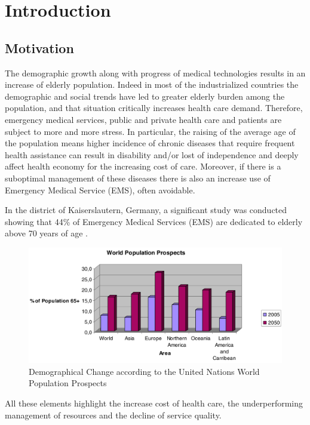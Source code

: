 \documentclass{thesisreport}
\begin{document}
 \listoftables
 
 \tableofcontents
 
 
 \chapter{Introduction}

\section{Motivation}
  The demographic growth along with progress of medical technologies results in an increase of elderly population. Indeed in most of the industrialized countries the demographic and social trends have led to greater elderly burden among the population, and that situation critically increases health care demand. Therefore, emergency medical services, public and private health care and patients are subject to more and more stress. 
  In particular, the raising of the average age of the population means higher incidence of chronic diseases that require frequent health assistance can result in disability and/or lost of independence and deeply affect health economy for the increasing cost of care. Moreover, if there is a suboptimal management of these diseases there is also an increase use of Emergency Medical Service (EMS), often avoidable.
 
 In the district of Kaiserslautern, Germany, a significant study was conducted showing that 44\% of Emergency Medical Services (EMS) are dedicated to elderly above 70 years of age \cite{kleinberger2007ambient}.
 	\begin{figure}[H]
		\centering
		\includegraphics[width=15cm]{Thesis/data/populationProspect.png}
		\caption{\small{Demographical Change according to the United Nations World Population Prospects \cite{kleinberger2007ambient}}}
		\label{fig:populationProspect}
	\end{figure}
 All these elements highlight the increase cost of health care, the underperforming management of resources and the decline of service quality.
 
\end{document}
